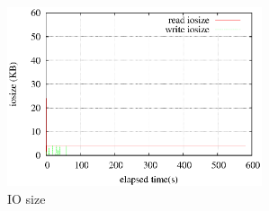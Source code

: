 \documentclass[11pt,a4paper]{jsarticle}
\begin{document}
\begin{figure}[thbp]
 \begin{center}
  \includegraphics[width=75mm]{1idxscan_ra0iosize.eps}
 \end{center}
 \caption{IO size}
 \label{fig:1idx0iosize}
\end{figure}
\end{document}

